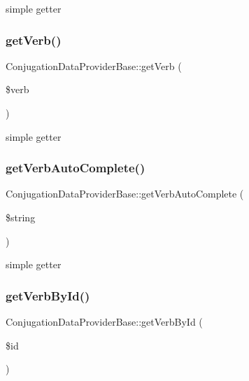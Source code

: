 simple getter \hypertarget{class_conjugation_data_provider_base_a45ac93643d08f3099bf95faa22e9ba55}{}\label{class_conjugation_data_provider_base_a45ac93643d08f3099bf95faa22e9ba55} 
\subsubsection{\texorpdfstring{get\+Verb()}{getVerb()}}
{\footnotesize\ttfamily Conjugation\+Data\+Provider\+Base\+::get\+Verb (\begin{DoxyParamCaption}\item[{}]{\$verb }\end{DoxyParamCaption})\hspace{0.3cm}{\ttfamily [abstract]}}

simple getter \hypertarget{class_conjugation_data_provider_base_a517127918e71fd89e1b7717c26353f87}{}\label{class_conjugation_data_provider_base_a517127918e71fd89e1b7717c26353f87} 
\subsubsection{\texorpdfstring{get\+Verb\+Auto\+Complete()}{getVerbAutoComplete()}}
{\footnotesize\ttfamily Conjugation\+Data\+Provider\+Base\+::get\+Verb\+Auto\+Complete (\begin{DoxyParamCaption}\item[{}]{\$string }\end{DoxyParamCaption})\hspace{0.3cm}{\ttfamily [abstract]}}

simple getter \hypertarget{class_conjugation_data_provider_base_a8269abd2a9be2679d2cd9f7f50ae9151}{}\label{class_conjugation_data_provider_base_a8269abd2a9be2679d2cd9f7f50ae9151} 
\subsubsection{\texorpdfstring{get\+Verb\+By\+Id()}{getVerbById()}}
{\footnotesize\ttfamily Conjugation\+Data\+Provider\+Base\+::get\+Verb\+By\+Id (\begin{DoxyParamCaption}\item[{}]{\$id }\end{DoxyParamCaption})\hspace{0.3cm}{\ttfamily [abstract]}}

